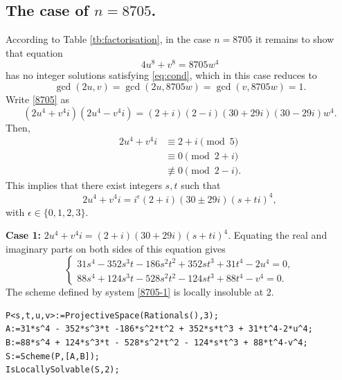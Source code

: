 \documentclass[a4paper,12pt,english,reqno]{amsart}
\begin{document}
\subsection{The case of $n=8705$.}%

 According to Table \ref{tb:factorisation}, in the case $n=8705$ it remains to
show that equation
\begin{equation}\label{8705}
4u^8+v^8=8705 w^4
\end{equation}
has no integer solutions satisfying \eqref{eq:cond}, which in this case reduces to  \[\gcd(2u,v)=\gcd(2u,8705w)=\gcd(v,8705w)=1.\]
Write \eqref{8705} as 
\begin{equation} (2u^4+v^4i)(2u^4-v^4i)=(2+i)(2-i)(30+29i)(30-29i)w^4.
\end{equation}
Then, \[\begin{split}
    2u^4+v^4i&\equiv 2+i\pmod{5}\\
    &\equiv 0\pmod{2+i}\\
    &\not\equiv 0\pmod{2-i}.
\end{split}\]
This implies that there exist integers $s,t$ such that 
\[2u^4+v^4i=i^{\epsilon}(2+i)(30\pm 29i)(s+ti)^4,\]
with $\epsilon \in \{0,1,2,3\}$.


{\bf Case 1:} $2u^4+v^4i=(2+i)(30+29i)(s+ti)^4$. Equating the real and imaginary parts on both sides of this equation gives
\begin{equation}\label{8705-1}
\begin{cases}
31s^4 - 352s^3t - 186s^2t^2 + 352st^3 + 31t^4 - 2u^4=0,\\
88s^4 + 124s^3t - 528s^2t^2 - 124st^3 + 88t^4 - v^4=0.
\end{cases}
\end{equation}
The scheme defined by system \eqref{8705-1} is locally insoluble at $2$.

\begin{lstlisting}
P<s,t,u,v>:=ProjectiveSpace(Rationals(),3);
A:=31*s^4 - 352*s^3*t -186*s^2*t^2 + 352*s*t^3 + 31*t^4-2*u^4;
B:=88*s^4 + 124*s^3*t - 528*s^2*t^2 - 124*s*t^3 + 88*t^4-v^4;
S:=Scheme(P,[A,B]);
IsLocallySolvable(S,2);
\end{lstlisting}
\end{document}
